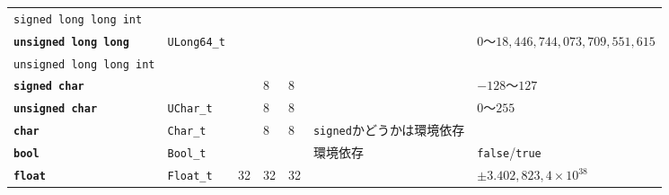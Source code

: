 \begin{landscape}
\begin{table}
\begin{tabular}{|l|l|l|l|l|l|l|}
\texttt{signed long long int}       &                             &                          &                     &                     &                                                   &                                                                                                                             \\ \cline{1-3} \cline{7-7} 
\textbf{\texttt{unsigned long long}}& \multirow{2}{*}{\texttt{ULong64\_t}} &                          &                     &                     &                                                   & \multirow{2}{*}{$0$〜$18,446,744,073,709,551,615$}                               \\ \cline{1-1}
\texttt{unsigned long long int}     &                             &                          &                     &                     &                                                   &                                                                                                                             \\ \hline
\textbf{\texttt{signed char}}       &                             &                        & 8                   & 8                   &                                                   & $-128$〜$127$                                                                    \\ \hline
\textbf{\texttt{unsigned char}}     & \texttt{UChar\_t}                    &                         & 8                   & 8                   &                                                   & $0$〜$255$                                                                       \\ \hline
\textbf{\texttt{char}}              & \texttt{Char\_t}                     &                         & 8                   & 8                   & \texttt{signed}かどうかは環境依存 &                                                                                                                             \\ \hline
\textbf{\texttt{bool}}              & \texttt{Bool\_t}                     &                          &                     &                     & 環境依存                                              & \texttt{false}/\texttt{true}                                                                                                                  \\ \hline
\textbf{\texttt{float}}             & \texttt{Float\_t}                    & 32                       & 32                  & 32                  &                                                   & $\pm3.402,823,4\times 10^{38}$                                                                                                        \\ \hline

\end{tabular}
\end{table}
\end{landscape}

